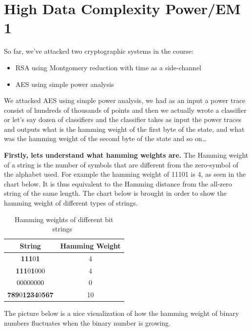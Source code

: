 \chapter{High Data Complexity Power/EM 1} \label{cha:High Data Complexity Power/EM 1}

So far, we've attacked two cryptographic systems in the course:
\begin{itemize}
    \item RSA using Montgomery reduction with time as a side-channel
    \item AES using simple power analysis
\end{itemize}

We attacked AES using simple power analysis, we had as an input a power trace
consist of hundreds of thousands of points and then we actually wrote a
classifier or let's say dozen of classifiers and the classifier takes as input
the power traces and outputs what is the hamming weight of the first byte of the
state, and what was the hamming weight of the second byte of the state and so
on\ldots 


\textbf{Firstly, lets understand what hamming weights are.}
The Hamming weight of a string is the number of symbols that are different from the zero-symbol of the alphabet used. For example the hamming weight of 11101 is 4, as seen in the chart below. It is thus equivalent to the Hamming distance from the all-zero string of the same length.
The chart below is brought in order to show the hamming weight of different types of strings.

\begin{table}
    \caption{Hamming weights of different bit strings~\cite{hamming}}\label{hammingWeights}
    \begin{center}
    \begin{tabular}{ cc }
        \toprule
        String & Hamming Weight \\ 
        \midrule
        \textbf{111}0\textbf{1} & 4 \\ 
        \textbf{111}0\textbf{1}000 & 4 \\
        00000000 & 0 \\
        \textbf{789}0\textbf{1234}0\textbf{567} & 10 \\
        \bottomrule
    \end{tabular}
    \end{center}
\end{table}

The picture below is a nice visualization of how the hamming weight of binary numbers fluctuates when the binary number is growing.

